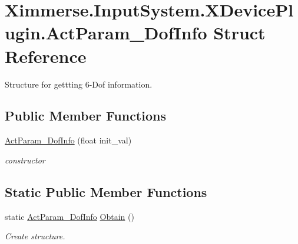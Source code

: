 \hypertarget{struct_ximmerse_1_1_input_system_1_1_x_device_plugin_1_1_act_param__6_dof_info}{}\section{Ximmerse.\+Input\+System.\+X\+Device\+Plugin.\+Act\+Param\+\_\+Dof\+Info Struct Reference}
\label{struct_ximmerse_1_1_input_system_1_1_x_device_plugin_1_1_act_param__6_dof_info}


Structure for gettting 6-\/\+Dof information.  


\subsection*{Public Member Functions}
\begin{DoxyCompactItemize}
\item 
\mbox{\label{struct_ximmerse_1_1_input_system_1_1_x_device_plugin_1_1_act_param__6_dof_info_ae77aeb31e65e46bccb85f3ad791d8aa6}} 
\mbox{\hyperlink{struct_ximmerse_1_1_input_system_1_1_x_device_plugin_1_1_act_param__6_dof_info_ae77aeb31e65e46bccb85f3ad791d8aa6}{Act\+Param\+\_\+Dof\+Info}} (float init\+\_\+val)
\begin{DoxyCompactList}\small\item\em constructor \end{DoxyCompactList}\end{DoxyCompactItemize}
\subsection*{Static Public Member Functions}
\begin{DoxyCompactItemize}
\item 
static \mbox{\hyperlink{struct_ximmerse_1_1_input_system_1_1_x_device_plugin_1_1_act_param__6_dof_info}{Act\+Param\+\_\+Dof\+Info}} \mbox{\hyperlink{struct_ximmerse_1_1_input_system_1_1_x_device_plugin_1_1_act_param__6_dof_info_a91649d265d8ce0f1111d1df85620b872}{Obtain}} ()
\begin{DoxyCompactList}\small\item\em Create structure. \end{DoxyCompactList}\end{DoxyCompactItemize}
